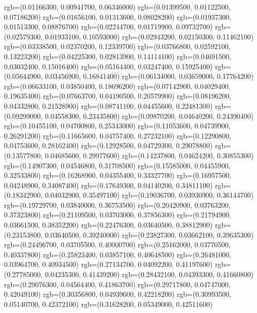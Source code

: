 {{        rgb=(0.01166300, 0.00941700, 0.06346000)
        rgb=(0.01399500, 0.01122500, 0.07186200)
        rgb=(0.01656100, 0.01313600, 0.08028200)
        rgb=(0.01937300, 0.01513300, 0.08876700)
        rgb=(0.02244700, 0.01719900, 0.09732700)
        rgb=(0.02579300, 0.01933100, 0.10593000)
        rgb=(0.02943200, 0.02150300, 0.11462100)
        rgb=(0.03338500, 0.02370200, 0.12339700)
        rgb=(0.03766800, 0.02592100, 0.13223200)
        rgb=(0.04225300, 0.02813900, 0.14114100)
        rgb=(0.04691500, 0.03032400, 0.15016400)
        rgb=(0.05164400, 0.03247400, 0.15925400)
        rgb=(0.05644900, 0.03456900, 0.16841400)
        rgb=(0.06134000, 0.03659000, 0.17764200)
        rgb=(0.06633100, 0.03850400, 0.18696200)
        rgb=(0.07142900, 0.04029400, 0.19635400)
        rgb=(0.07663700, 0.04190500, 0.20579900)
        rgb=(0.08196200, 0.04332800, 0.21528900)
        rgb=(0.08741100, 0.04455600, 0.22481300)
        rgb=(0.09299000, 0.04558300, 0.23435800)
        rgb=(0.09870200, 0.04640200, 0.24390400)
        rgb=(0.10455100, 0.04700800, 0.25343000)
        rgb=(0.11053600, 0.04739900, 0.26291200)
        rgb=(0.11665600, 0.04757400, 0.27232100)
        rgb=(0.12290800, 0.04753600, 0.28162400)
        rgb=(0.12928500, 0.04729300, 0.29078800)
        rgb=(0.13577800, 0.04685600, 0.29977600)
        rgb=(0.14237800, 0.04624200, 0.30855300)
        rgb=(0.14907300, 0.04546800, 0.31708500)
        rgb=(0.15585000, 0.04455900, 0.32533800)
        rgb=(0.16268900, 0.04355400, 0.33327700)
        rgb=(0.16957500, 0.04248900, 0.34087400)
        rgb=(0.17649300, 0.04140200, 0.34811100)
        rgb=(0.18342900, 0.04032900, 0.35497100)
        rgb=(0.19036700, 0.03930900, 0.36144700)
        rgb=(0.19729700, 0.03840000, 0.36753500)
        rgb=(0.20420900, 0.03763200, 0.37323800)
        rgb=(0.21109500, 0.03703000, 0.37856300)
        rgb=(0.21794900, 0.03661500, 0.38352200)
        rgb=(0.22476300, 0.03640500, 0.38812900)
        rgb=(0.23153800, 0.03640500, 0.39240000)
        rgb=(0.23827300, 0.03662100, 0.39635300)
        rgb=(0.24496700, 0.03705500, 0.40000700)
        rgb=(0.25162000, 0.03770500, 0.40337800)
        rgb=(0.25823400, 0.03857100, 0.40648500)
        rgb=(0.26481000, 0.03964700, 0.40934500)
        rgb=(0.27134700, 0.04092200, 0.41197600)
        rgb=(0.27785000, 0.04235300, 0.41439200)
        rgb=(0.28432100, 0.04393300, 0.41660800)
        rgb=(0.29076300, 0.04564400, 0.41863700)
        rgb=(0.29717800, 0.04747000, 0.42049100)
        rgb=(0.30356800, 0.04939600, 0.42218200)
        rgb=(0.30993500, 0.05140700, 0.42372100)
        rgb=(0.31628200, 0.05349000, 0.42511600)
}}
